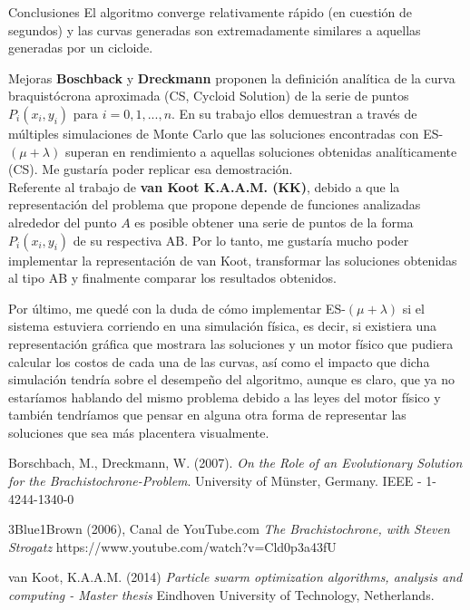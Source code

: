 \documentclass[10pt, letterpaper]{article}
\theoremstyle{definition}
\begin{document}
\begin{section}{Conclusiones}
    El algoritmo converge relativamente rápido (en cuestión de segundos) y las
    curvas generadas son extremadamente similares a aquellas generadas por
    un cicloide.

    \begin{subsection}{Mejoras}
        \textbf{Boschback} y \textbf{Dreckmann} proponen la definición analítica
        de la curva braquistócrona aproximada (CS, Cycloid Solution) de la serie
        de puntos $P_i(x_i, y_i)$ para $i={0, 1, ..., n}$. En su trabajo ellos
        demuestran a través de múltiples simulaciones de Monte Carlo que las
        soluciones encontradas con ES-$(\mu + \lambda)$ superan en rendimiento
        a aquellas soluciones obtenidas analíticamente (CS). Me gustaría poder
        replicar esa demostración.\\

        Referente al trabajo de \textbf{van Koot K.A.A.M. (KK)}, debido a que
        la representación del problema que propone depende de funciones
        analizadas alrededor del punto $A$ es posible obtener una serie de puntos
        de la forma $P_i(x_i, y_i)$ de su respectiva AB. Por lo tanto, me gustaría
        mucho poder implementar la representación de van Koot, transformar las
        soluciones obtenidas al tipo AB y finalmente comparar los resultados
        obtenidos.

        Por último, me quedé con la duda de cómo implementar ES-$(\mu + \lambda)$
        si el sistema estuviera corriendo en una simulación física, es decir,
        si existiera una representación gráfica que mostrara las soluciones
        y un motor físico que pudiera calcular los costos de cada una de las
        curvas, así como el impacto que dicha simulación tendría sobre el desempeño
        del algoritmo, aunque es claro, que ya no estaríamos hablando del mismo
        problema debido a las leyes del motor físico y también tendríamos que
        pensar en alguna otra forma de representar las soluciones que sea más
        placentera visualmente.
    \end{subsection}
\end{section}


\clearpage
\begin{thebibliography}{9}

      Borschbach, M., Dreckmann, W. (2007).
      \textit{On the Role of an Evolutionary Solution for the Brachistochrone-Problem}.
      University of Münster, Germany.
      IEEE - 1-4244-1340-0

        3Blue1Brown (2006), Canal de YouTube.com
        \textit{The Brachistochrone, with Steven Strogatz}
        \small{https://www.youtube.com/watch?v=Cld0p3a43fU}

        van Koot, K.A.A.M. (2014)
        \textit{Particle swarm optimization algorithms, analysis and computing - Master thesis}
        Eindhoven University of Technology, Netherlands.
\end{thebibliography}
\end{document}
